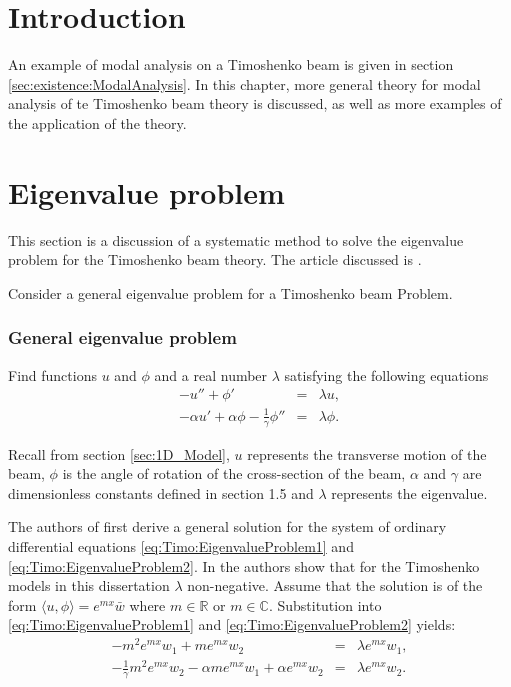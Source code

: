 \documentclass[../../main.tex]{subfiles}
\begin{document}
\section{Introduction}
An example of modal analysis on a Timoshenko beam is given in section \ref{sec:existence:ModalAnalysis}. In this chapter, more general theory for modal analysis of te Timoshenko beam theory is discussed, as well as more examples of the application of the theory.

\section{Eigenvalue problem}\label{sec:Timo:EigenvalueProblem}
This section is a discussion of a systematic method to solve the eigenvalue problem for the Timoshenko beam theory. The article discussed is \cite{VV06}.

Consider a general eigenvalue problem for a Timoshenko beam Problem.
\subsubsection{General eigenvalue problem} \label{sssec:Timo:EigenvalueProblem}
Find functions $u$ and $\phi$ and a real number $\lambda$ satisfying the following equations
\begin{eqnarray}
-u'' + \phi' &=& \lambda u, \label{eq:Timo:EigenvalueProblem1}\\
-\alpha u' + \alpha\phi - \frac{1}{\gamma}\phi'' &=& \lambda\phi.\label{eq:Timo:EigenvalueProblem2}
\end{eqnarray}

Recall from section \ref{sec:1D_Model}, $u$ represents the transverse motion of the beam, $\phi$ is the angle of rotation of the cross-section of the beam, $\alpha$ and $\gamma$ are dimensionless constants defined in section 1.5 and $\lambda$ represents the eigenvalue. 

The authors of \cite{VV06} first derive a general solution for the system of ordinary differential equations \eqref{eq:Timo:EigenvalueProblem1} and \eqref{eq:Timo:EigenvalueProblem2}. In \cite{VV06} the authors show that for the Timoshenko models in this dissertation $\lambda$ non-negative. Assume that the solution is of the form $\langle u, \phi \rangle = e^{mx}\bar{w}$ where $m\in \mathbb{R}$ or $m\in \mathbb{C}$. Substitution into \eqref{eq:Timo:EigenvalueProblem1} and \eqref{eq:Timo:EigenvalueProblem2} yields:
\begin{eqnarray*}
-m^{2}e^{mx}w_{1}+me^{mx}w_{2}&=&\lambda e^{mx}w_{1},\\
-\frac{1}{\gamma}m^{2}e^{mx}w_{2}-\alpha me^{mx}w_{1}+\alpha e^{mx}w_{2}&=&\lambda e^{mx}w_{2}.
\end{eqnarray*}
\end{document}

